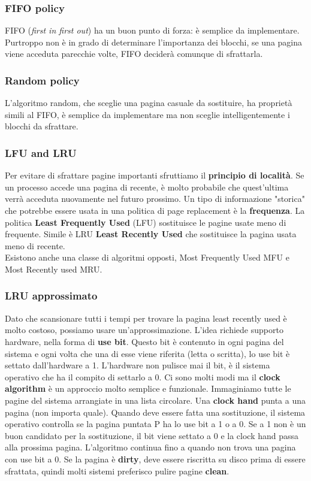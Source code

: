 \documentclass[12pt, twoside, letterpaper]{article}
\begin{document}
			\subsubsection{FIFO policy}
				FIFO (\textit{first in first out}) ha un buon punto di forza: è semplice da implementare. Purtroppo non è in grado di determinare l'importanza dei blocchi, se una pagina viene acceduta parecchie volte, FIFO deciderà comunque di sfrattarla.
			
			\subsubsection{Random policy}
				L'algoritmo random, che sceglie una pagina casuale da sostituire, ha proprietà simili al FIFO, è semplice da implementare ma non sceglie intelligentemente i blocchi da sfrattare.
				
			\subsubsection{LFU and LRU }
				Per evitare di sfrattare pagine importanti sfruttiamo il \textbf{principio di località}. Se un processo accede una pagina di recente, è molto probabile che quest'ultima verrà acceduta nuovamente nel futuro prossimo. Un tipo di informazione "storica" che potrebbe essere usata in una politica di page replacement è la \textbf{frequenza}. La politica \textbf{Least Frequently Used} (LFU) sostituisce le pagine usate meno di frequente. Simile è LRU \textbf{Least Recently Used} che sostituisce la pagina usata meno di recente.\\		
				Esistono anche una classe di algoritmi opposti, Most Frequently Used MFU e Most Recently used MRU.
				
			\subsubsection{LRU approssimato}
				Dato che scansionare tutti i tempi per trovare la pagina least recently used è molto costoso, possiamo usare un'approssimazione. L'idea richiede supporto hardware, nella forma di \textbf{use bit}. Questo bit è contenuto in ogni pagina del sistema e ogni volta che una di esse viene riferita (letta o scritta), lo use bit è settato dall'hardware a 1. L'hardware non pulisce mai il bit, è il sistema operativo che ha il compito di settarlo a 0. Ci sono molti modi ma il \textbf{clock algorithm} è un approccio molto semplice e funzionale. Immaginiamo tutte le pagine del sistema arrangiate in una lista circolare. Una \textbf{clock hand} punta a una pagina (non importa quale). Quando deve essere fatta una sostituzione, il sistema operativo controlla se la pagina puntata P ha lo use bit a 1 o a 0. Se a 1 non è un buon candidato per la sostituzione, il bit viene settato a 0 e la clock hand passa alla prossima pagina. L'algoritmo continua fino a quando non trova una pagina con use bit a 0. Se la pagina è \textbf{dirty}, deve essere riscritta su disco prima di essere sfrattata, quindi molti sistemi preferisco pulire pagine \textbf{clean}.
				
\end{document}
